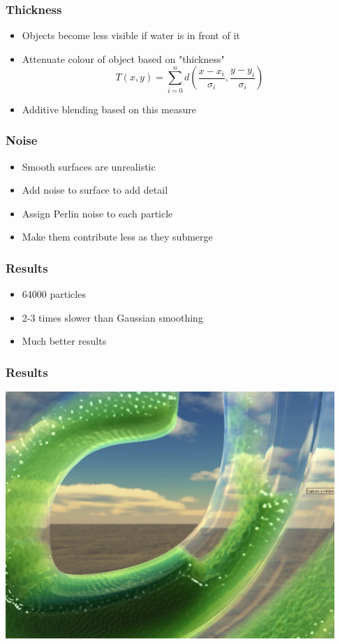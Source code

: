 \documentclass{beamer}
\begin{document}
	\begin{frame}[t]\frametitle{Thickness}
	    \begin{itemize}
	    	\item Objects become less visible if water is in front of it
	    	\item Attenuate colour of object based on "thickness"
	    	\begin{equation}
	    		T(x, y) = \sum_{i = 0}^{n} d(\frac{x - x_i}{\sigma_i}, \frac{y - y_i}{\sigma_i})
	    	\end{equation}
	    	\item Additive blending based on this measure
	    \end{itemize}
	\end{frame}
	\begin{frame}[t]\frametitle{Noise}
	    \begin{itemize}
	    	\item Smooth surfaces are unrealistic
	    	\item Add noise to surface to add detail
	    	\item Assign Perlin noise to each particle
	    	\item Make them contribute less as they submerge
	    \end{itemize}
	\end{frame}
	\begin{frame}[t]\frametitle{Results}
	    \begin{itemize}
	    	\item 64000 particles
	    	\item 2-3 times slower than Gaussian smoothing
	    	\item Much better results
	    \end{itemize}
	\end{frame}
	\begin{frame}[t]\frametitle{Results}
	    \includegraphics[scale=.5]{gaussian.png}
	\end{frame}
\end{document}
